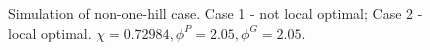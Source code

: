 \begin{figure}[ht]
\begin{center}
{  } 
  \caption{Simulation of non-one-hill case. Case 1 - not local optimal; Case 2 - local optimal. $ \chi = 0.72984 , \phi^{P} = 2.05 , \phi^{G} = 2.05 $.} 
\end{center}
\end{figure}

